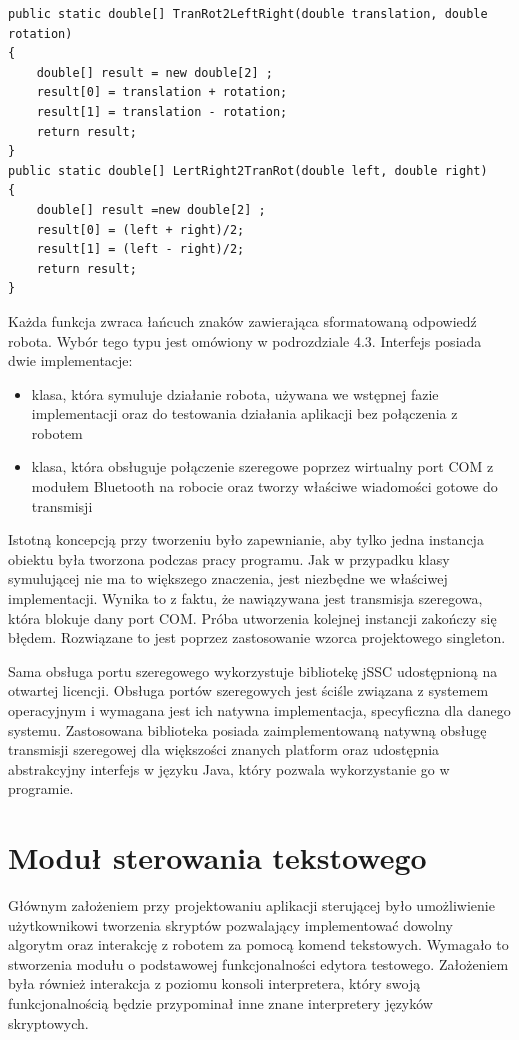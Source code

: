 \documentclass[eng,printmode]{mgr}
\begin{document}
\begin{lstlisting}[style=java]
public static double[] TranRot2LeftRight(double translation, double rotation)
{
	double[] result = new double[2] ;
	result[0] = translation + rotation;
	result[1] = translation - rotation;
	return result;
}	
public static double[] LertRight2TranRot(double left, double right)
{
	double[] result =new double[2] ;
	result[0] = (left + right)/2;
	result[1] = (left - right)/2;
	return result;
}

\end{lstlisting}

Każda funkcja zwraca łańcuch znaków zawierająca sformatowaną odpowiedź robota. Wybór tego typu jest omówiony w podrozdziale 4.3.  Interfejs posiada dwie implementacje:

\begin{itemize}
  \item klasa, która symuluje działanie robota, używana we wstępnej fazie implementacji oraz do testowania działania aplikacji bez połączenia z robotem
  \item klasa, która obsługuje połączenie szeregowe poprzez wirtualny port COM z modułem Bluetooth na robocie oraz tworzy właściwe wiadomości gotowe do transmisji
\end{itemize}

Istotną koncepcją przy tworzeniu było zapewnianie, aby tylko jedna instancja obiektu była tworzona podczas pracy programu. Jak w przypadku klasy symulującej nie ma to większego znaczenia, jest niezbędne we właściwej implementacji. Wynika to z faktu, że nawiązywana jest transmisja szeregowa, która blokuje dany port COM. Próba utworzenia kolejnej instancji zakończy się błędem. Rozwiązane to jest poprzez zastosowanie wzorca projektowego singleton. 

Sama obsługa portu szeregowego wykorzystuje bibliotekę jSSC udostępnioną na otwartej licencji. Obsługa portów szeregowych jest ściśle związana z systemem operacyjnym  i wymagana jest ich natywna implementacja, specyficzna dla danego systemu. Zastosowana biblioteka posiada zaimplementowaną natywną obsługę transmisji szeregowej dla większości znanych platform oraz udostępnia abstrakcyjny interfejs w języku Java, który pozwala wykorzystanie go w programie.

 \section{Moduł sterowania tekstowego}
Głównym założeniem przy projektowaniu aplikacji sterującej było umożliwienie użytkownikowi tworzenia skryptów pozwalający implementować dowolny algorytm oraz interakcję z robotem za pomocą komend tekstowych. Wymagało to stworzenia modułu o podstawowej funkcjonalności edytora testowego. Założeniem była również interakcja z poziomu konsoli interpretera, który swoją funkcjonalnością będzie przypominał inne znane interpretery języków skryptowych.
\end{document}
